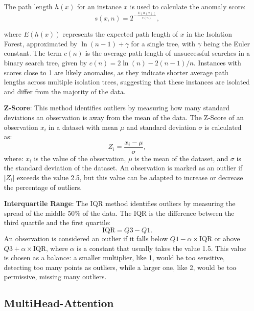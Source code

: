 \documentclass{ws-ijitdm}
\begin{document}
\begin{itemlist}
    The path length $h(x)$ for an instance $x$ is used to calculate the anomaly score:
    \[
    s(x, n) = 2^{-\frac{E(h(x))}{c(n)}},
    \]
    
    where $E(h(x))$ represents the expected path length of $x$ in the Isolation Forest, approximated by $\ln(n-1) + \gamma$ for a single tree, with $\gamma$ being the Euler constant. The term $c(n)$ is the average path length of unsuccessful searches in a binary search tree, given by $c(n) = 2 \ln(n) - 2(n-1)/n$. Instances with scores close to 1 are likely anomalies, as they indicate shorter average path lengths across multiple isolation trees, suggesting that these instances are isolated and differ from the majority of the data.
    
    \item \textbf{Z-Score}: This method identifies outliers by measuring how many standard deviations an observation is away from the mean of the data\cite{36}. The Z-Score of an observation $x_i$ in a dataset with mean $\mu$ and standard deviation $\sigma$ is calculated as:
    \[
    Z_i = \frac{x_i - \mu}{\sigma},
    \]
    where:  $x_i$ is the value of the observation, $\mu$ is the mean of the dataset, and $\sigma$ is the standard deviation of the dataset. %
    An observation is marked as an outlier if $|Z_i|$ exceeds the value 2.5\cite{36}, but this value can be adapted to increase or decrease the percentage of outliers.
    
    \item \textbf{Interquartile Range}: The IQR method identifies outliers by measuring the spread of the middle 50\% of the data\cite{36}. The IQR is the difference between the third quartile and the first quartile:
    \[
        \text{IQR} = Q3 - Q1.
    \]
    An observation is considered an outlier if it falls below $Q1 - \alpha \times \text{IQR}$ or above $Q3 + \alpha \times \text{IQR}$, where $\alpha$ is a constant that usually takes the value 1.5. This value is chosen as a balance: a smaller multiplier, like 1, would be too sensitive, detecting too many points as outliers, while a larger one, like 2, would be too permissive, missing many outliers\cite{37}. %
\end{itemlist}

\subsection{MultiHead-Attention}
\end{document}
